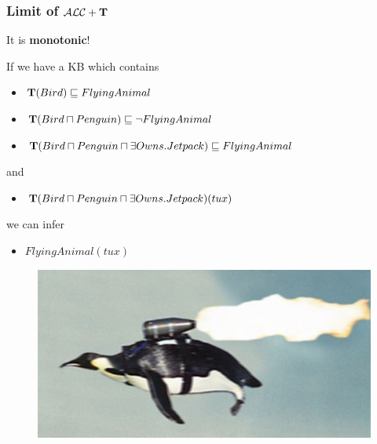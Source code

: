 \documentclass[serif,mathserif]{beamer}
\newcommand{\tip}{{\bf T}}
\newcommand{\alct}{\mathcal{ALC}+\tip}
\begin{document}
\begin{frame}
	\frametitle{Limit of $\alct$}
	It is \textbf{monotonic}!
	\begin{example}
	If we have a KB which contains
		\begin{itemize}
		\item $\tip(Bird) \sqsubseteq FlyingAnimal$
		\item $\tip(Bird \sqcap Penguin) \sqsubseteq \neg FlyingAnimal$
		\item $\tip(Bird \sqcap Penguin \sqcap \exists Owns.Jetpack) \sqsubseteq FlyingAnimal$
		\end{itemize}
		and		
		\begin{itemize}
		\item $\tip(Bird \sqcap Penguin \sqcap \exists Owns.Jetpack) (tux)$
		\end{itemize}
		\begin{multicols}{2}
		we can infer
		\begin{itemize}
		\item $FlyingAnimal(tux)$	
		\end{itemize}
		\vspace{2.1cm}
		
		\pause
		\begin{figure}[htp]
		\centering
		\includegraphics[scale=0.20]{img/penguin.png}
		\caption{}
		\label{}
		\end{figure}
		
		\end{multicols}
	\end{example}
\end{frame}
\end{document}

